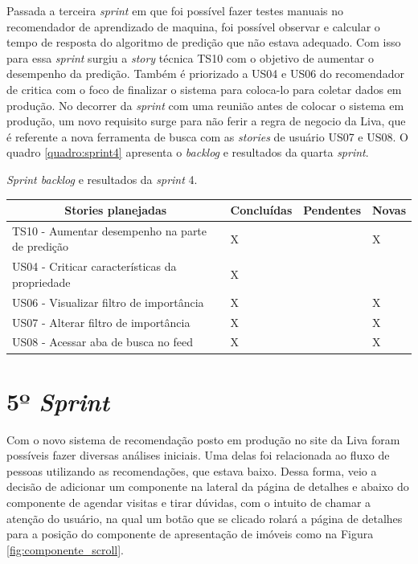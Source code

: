 Passada a terceira \textit{sprint} em que foi possível fazer testes manuais no recomendador de aprendizado de maquina, foi possível observar e calcular o tempo de resposta do algoritmo de predição que não estava adequado. Com isso para essa \textit{sprint} surgiu a \textit{story} técnica TS10 com o objetivo de aumentar o desempenho da predição. Também é priorizado a US04 e US06 do recomendador de critica com o foco de finalizar o sistema para coloca-lo para coletar dados em produção. No decorrer da \textit{sprint} com uma reunião antes de colocar o sistema em produção, um novo requisito surge para não ferir a regra de negocio da Liva, que é referente a nova ferramenta de busca com as \textit{stories} de usuário US07 e US08.  O quadro \ref{quadro:sprint4} apresenta o \textit{backlog} e resultados da quarta  \textit{sprint}.

\begin{quadro}[H]
\centering
\caption[\textit{Sprint backlog} e resultados da \textit{sprint} 4]{\textit{Sprint backlog} e resultados da \textit{sprint} 4.}
\label{quadro:sprint4}
\begin{tabular}{|p{6cm}|p{2cm}|p{2cm}|p{1cm}|}
\hline
\multicolumn{1}{|c|}{\textbf{Stories planejadas}} & \multicolumn{1}{c|}{\textbf{Concluídas}} & \multicolumn{1}{c|}{\textbf{Pendentes}} & \multicolumn{1}{c|}{\textbf{Novas}} \\ \hline
TS10 - Aumentar desempenho na parte de predição & X &  & X \\ \hline
US04 - Criticar características da propriedade & X &  & \\ \hline
US06 - Visualizar filtro de importância & X &  & X \\ \hline
US07 - Alterar filtro de importância & X &  & X \\ \hline
US08 - Acessar aba de busca no feed & X &  & X \\ \hline
\end{tabular}
\end{quadro}


\section{5º \textit{Sprint}}

Com o novo sistema de recomendação posto em produção no site da Liva foram possíveis fazer diversas análises iniciais. Uma delas foi relacionada ao fluxo de pessoas utilizando as recomendações, que estava baixo. Dessa forma, veio a decisão de adicionar um componente na lateral da página de detalhes e abaixo do componente de agendar visitas e tirar dúvidas, com o intuito de chamar a atenção do usuário, na qual um botão que se clicado rolará a página de detalhes para a posição do componente de apresentação de imóveis como na Figura \ref{fig:componente_scroll}.


